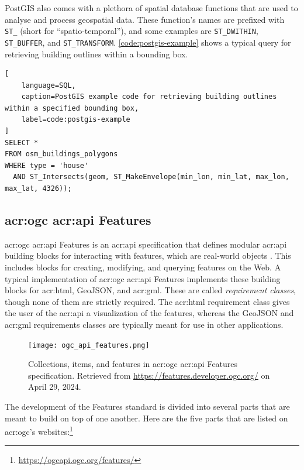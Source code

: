 PostGIS also comes with a plethora of spatial database functions that are used to analyse and process geospatial data. These function's names are prefixed with \texttt{ST\_} (short for \enquote{spatio-temporal}), and some examples are \texttt{ST\_DWITHIN}, \texttt{ST\_BUFFER}, and \texttt{ST\_TRANSFORM}. \autoref{code:postgis-example} shows a typical query for retrieving building outlines within a bounding box.

\begin{lstlisting}[
    language=SQL,
    caption=PostGIS example code for retrieving building outlines within a specified bounding box,
    label=code:postgis-example
]
SELECT * 
FROM osm_buildings_polygons 
WHERE type = 'house' 
  AND ST_Intersects(geom, ST_MakeEnvelope(min_lon, min_lat, max_lon, max_lat, 4326));
\end{lstlisting}

\subsection[OGC API Features]{\acrshort{acr:ogc} \acrshort{acr:api} Features}
\label{subsec:ogc-api-features}

\acrshort{acr:ogc} \acrshort{acr:api} Features is an \acrshort{acr:api} specification that defines modular \acrshort{acr:api} building blocks for interacting with features, which are real-world objects \citep{opengeospatialconsortiumOGCAPIFeatures2022}. This includes blocks for creating, modifying, and querying features on the Web. A typical implementation of \acrshort{acr:ogc} \acrshort{acr:api} Features implements these building blocks for \acrshort{acr:html}, GeoJSON, and \acrshort{acr:gml}. These are called \textit{requirement classes}, though none of them are strictly required. The \acrshort{acr:html} requirement class gives the user of the \acrshort{acr:api} a visualization of the features, whereas the GeoJSON and \acrshort{acr:gml} requirements classes are typically meant for use in other applications.

\begin{figure}[h]
    \centering
    \texttt{[image: ogc\_api\_features.png]}
    \caption{Collections, items, and features in \acrshort{acr:ogc} \acrshort{acr:api} Features specification. Retrieved from \url{https://features.developer.ogc.org/} on April 29, 2024.}
    \label{fig:oaf-collections-items-features}
\end{figure}

The development of the Features standard is divided into several parts that are meant to build on top of one another. Here are the five parts that are listed on \acrshort{acr:ogc}'s websites:\footnote{\url{https://ogcapi.ogc.org/features/}}

